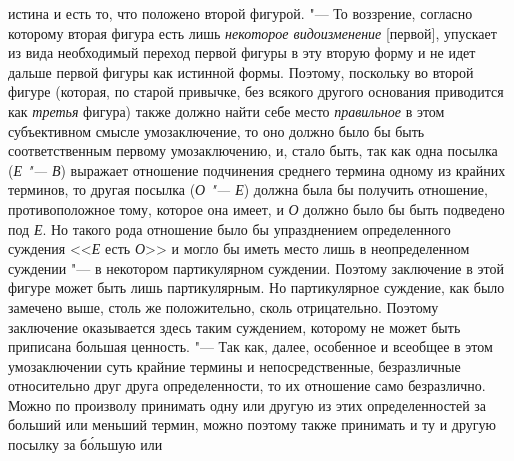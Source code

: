 истина и есть то, что положено второй фигурой. "--- То
воззрение, согласно которому вторая фигура есть лишь
{\em некоторое видоизменение}
[первой], упускает из вида необходимый переход первой фигуры
в эту вторую форму и не идет дальше первой фигуры как
истинной формы. Поэтому, поскольку во второй фигуре (которая, по старой
привычке, без всякого другого основания приводится как
{\em третья} фигура)
также должно найти себе место
{\em правильное} в этом
субъективном смысле умозаключение, то оно должно было бы быть
соответственным первому умозаключению, и, стало быть, так как одна посылка
({\em Е "--- В})
выражает отношение подчинения среднего термина одному из
крайних терминов, то другая посылка
({\em О "--- Е})
должна была бы получить отношение, противоположное тому,
которое она имеет, и {\em О} должно было бы быть подведено под
{\em Е}. Но такого рода
отношение было бы упразднением определенного суждения
<<{\em Е} есть {\em О}>> и могло бы иметь
место лишь в неопределенном суждении "--- в некотором
партикулярном суждении. Поэтому заключение в этой фигуре может быть лишь
партикулярным. Но партикулярное суждение, как было замечено выше, столь же
положительно, сколь отрицательно. Поэтому заключение оказывается здесь
таким суждением, которому не может быть приписана большая ценность. "---
Так как, далее, особенное и всеобщее в этом умозаключении
суть крайние термины и непосредственные, безразличные относительно друг
друга определенности, то их отношение само безразлично. Можно по произволу
принимать одну или другую из этих определенностей за больший или меньший
термин, можно поэтому также принимать и ту и другую посылку за б\'{о}льшую или
